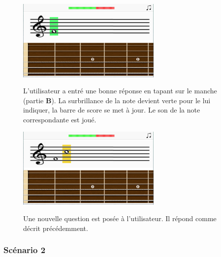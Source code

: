 \documentclass{scrreprt}
\begin{document}
\bigbreak

\begin{figure}[!ht]
  \begin{minipage}{0.55\linewidth}
    \includegraphics[width=7cm]{images/maquette_usecase/portee/question_une_note_1_vert.png}
  \end{minipage}\hfill
 \begin{minipage}{0.5\linewidth}
  {L'utilisateur a entré une bonne réponse en tapant sur le manche (partie \textbf{B}). La surbrillance de la note devient verte pour le lui indiquer, la barre de score se met à jour. Le son de la note correspondante est joué.}
   \end{minipage}
\end{figure} 

\bigbreak


\begin{figure}[!ht]
  \begin{minipage}{0.55\linewidth}
    \includegraphics[width=7cm]{images/maquette_usecase/portee/question_une_note_2.png}
  \end{minipage}\hfill
  \begin{minipage}{0.5\linewidth}
  {Une nouvelle question est posée à l'utilisateur. Il répond comme décrit précédemment.}
   \end{minipage}
\end{figure}

\bigbreak

\newpage


\subsubsection{Scénario 2}
\bigbreak
\end{document}
